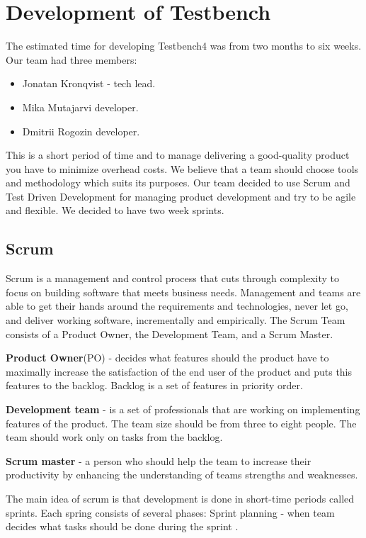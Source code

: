 \chapter{Development of Testbench}
\label{ch:testbenchdevelop}
  
  The estimated time for developing Testbench4 was from two months to six weeks.
  Our team had three members:
  \begin{itemize}
    \item Jonatan Kronqvist - tech lead.
    \item Mika Mutajarvi developer.
    \item Dmitrii Rogozin developer.
  \end{itemize}
  
   This is a short period of time and to manage delivering a good-quality product you
    have to minimize overhead costs. We believe that a team should choose tools
    and methodology which suits its purposes. 
    Our team decided to use Scrum and Test Driven Development for managing
    product development and try to be agile and flexible. 
    We decided to have two week sprints.

  \section{Scrum}
    Scrum is a management and control process that cuts through
    complexity to focus on building software that meets business needs. Management and teams are able to get their
    hands around the requirements and technologies, never let go, and deliver working software,
    incrementally and empirically. The Scrum Team consists of a Product Owner,
    the Development Team, and a Scrum Master.
    
  \textbf{Product Owner}(PO) - decides what features should the product have to
  maximally increase the satisfaction of the end user of the product and puts this features to the backlog.
  Backlog is a set of features in priority order.
  
  \textbf{Development team} - is
  a set of professionals that are working on implementing features of the product. 
  The team size should be from three to eight people. The team should work only on tasks from the backlog.
  
  \textbf{Scrum master} - a person who should help the team to increase their
  productivity by enhancing the understanding of teams strengths and weaknesses.

  The main idea of scrum is that development is done in short-time periods
  called sprints. Each spring consists of several phases:
  Sprint planning - when team decides what tasks should be done during the
  sprint .

